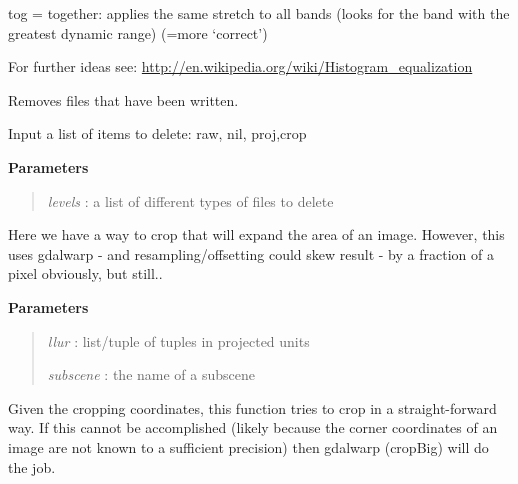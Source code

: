 \documentclass[letterpaper,10pt,english]{sphinxmanual}
\begin{document}
\begin{fulllineitems}
\begin{fulllineitems}
tog = together: applies the same stretch to all bands (looks for the band with the greatest dynamic range) (=more `correct')

For further ideas see: \href{http://en.wikipedia.org/wiki/Histogram\_equalization}{http://en.wikipedia.org/wiki/Histogram\_equalization}

\end{fulllineitems}


\begin{fulllineitems}
\label{code:Image.Image.cleanFiles}
Removes files that have been written.

Input a list of items to delete: raw, nil, proj,crop

\textbf{Parameters}
\begin{quote}

\emph{levels} : a list of different types of files to delete
\end{quote}

\end{fulllineitems}


\begin{fulllineitems}
\label{code:Image.Image.cropBig}
Here we have a way to crop that will expand the area of an image.
However, this uses gdalwarp - and resampling/offsetting could skew result - by a fraction of a pixel obviously, but still..

\textbf{Parameters}
\begin{quote}

\emph{llur}     : list/tuple of tuples in projected units

\emph{subscene} : the name of a subscene
\end{quote}

\end{fulllineitems}


\begin{fulllineitems}
\label{code:Image.Image.cropImg}
Given the cropping coordinates, this function tries to crop in a straight-forward way.
If this cannot be accomplished (likely because the corner coordinates of an image are not known to a sufficient precision)
then gdalwarp (cropBig) will do the job.


\end{fulllineitems}
\end{fulllineitems}
\end{document}
